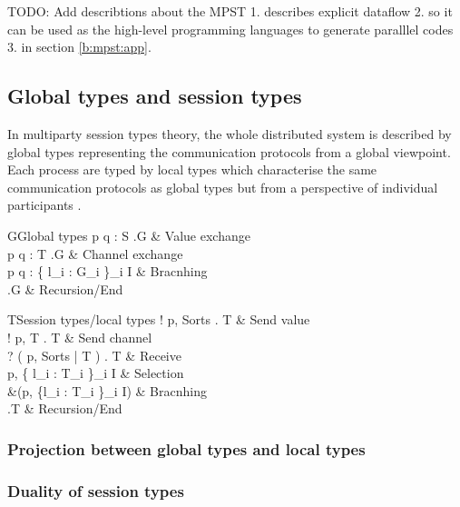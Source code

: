 TODO: Add describtions about the MPST 1. describes explicit dataflow 2. so it can be used as the high-level programming languages to generate paralllel codes 3. in section \ref{b:mpst:app}.
\subsection{Global types and session types}
In multiparty session types theory, the whole distributed system is described by global types representing the communication protocols from a global viewpoint.  Each process are typed by local types which characterise the same communication protocols as global types but from a perspective of individual participants \cite{coppoGentleIntroductionMultiparty2015}.
\begin{table}[ht]
\centering
\begin{grammar}{G\Coloneqq}{Global types}
  p \rightarrow q : \langle S \rangle.G & Value exchange \\
  p \rightarrow q : \langle T \rangle.G & Channel exchange \\
  p \rightarrow q : \{ l_i : G_i \}_{i \in I} & Bracnhing \\
  \mu {}.G  \mid {} \mid {} & Recursion/End
\end{grammar}
\caption{Global types} \label{b:mpst:gt}
\end{table}
\begin{table}[ht]
\centering
\begin{grammar}{T\Coloneqq}{Session types/local types}
  ! \langle p, Sorts \rangle . T & Send value\\
  ! \langle p, T \rangle . T & Send channel\\
  ? ( p, Sorts | T ) . T & Receive\\
  \oplus \langle p, \{ l_i : T_i \}_{i \in I} \rangle & Selection \\
  \&(p, \{l_i : T_i \}_{i \in I}) & Bracnhing \\
  \mu {}.T  \mid {} \mid {} & Recursion/End
\end{grammar}
\caption{Session types/local types} \label{b:mpst:st}
\end{table}
\subsubsection{Projection between global types and local types}
\subsubsection{Duality of session types}
\begin{table}[ht]
\begin{align*}
\end{align*}
\caption{Inductive definition of duality} \label{b:mpst:dual}
\end{table}
